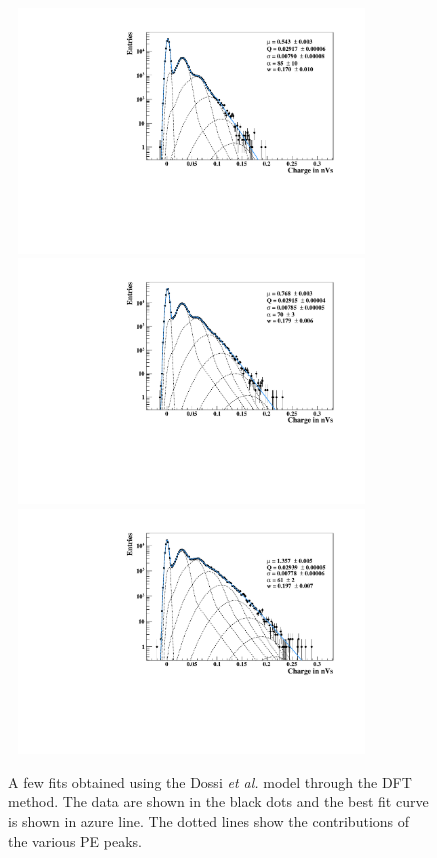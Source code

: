 \documentclass[a4paper,11pt]{article}
\begin{document}
\begin{figure}[!t]
\centering
\includegraphics[width=9.7cm, height=6.5cm]{figures/c1.pdf} \\[1.5ex]
\includegraphics[width=9.7cm, height=6.5cm]{figures/c2.pdf}  \\[1.5ex] %
\includegraphics[width=9.7cm, height=6.5cm]{figures/c3.pdf} %
\caption{A few fits obtained using the Dossi \emph{et al.} model through the DFT method. 
The data are shown in the black dots and the best fit curve is shown in azure line. 
The dotted lines show the contributions of the various PE peaks.}
\label{fig:Q}
\end{figure}
\end{document}
